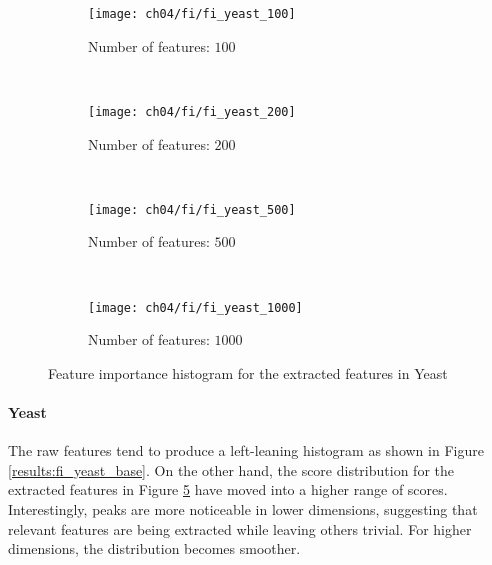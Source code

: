 \begin{figure}[h!]
    \centering
    \begin{subfigure}[b]{0.45\textwidth}
        \texttt{[image: ch04/fi/fi\_yeast\_100]}
        \caption{Number of features: $100$}
        \label{results:fi_yeast_100}
    \end{subfigure}
    ~ %
    \begin{subfigure}[b]{0.45\textwidth}
        \texttt{[image: ch04/fi/fi\_yeast\_200]}
        \caption{Number of features: $200$}
        \label{results:fi_yeast_200}
    \end{subfigure}
    ~ %
    \begin{subfigure}[b]{0.45\textwidth}
        \texttt{[image: ch04/fi/fi\_yeast\_500]}
        \caption{Number of features: $500$}
        \label{results:fi_yeast_500}
    \end{subfigure}
    ~ %
    \begin{subfigure}[b]{0.45\textwidth}
        \texttt{[image: ch04/fi/fi\_yeast\_1000]}
        \caption{Number of features: $1000$}
        \label{results:fi_yeast_1000}
    \end{subfigure}
    \caption{Feature importance histogram for the extracted features in Yeast}
    \label{results:fi_yeast}
\end{figure}

\paragraph{Yeast} The raw features tend to produce a left-leaning histogram
as shown in Figure \ref{results:fi_yeast_base}.  On the other hand, the score
distribution for the extracted features in Figure \ref{results:fi_yeast} have
moved into a higher range of scores. Interestingly, peaks are more noticeable
in lower dimensions, suggesting that relevant features are being extracted
while leaving others trivial. For higher dimensions, the distribution becomes
smoother. 

